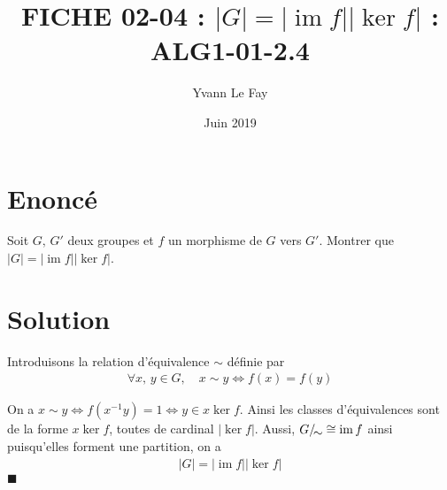 \documentclass{article}
\newcommand*{\QED}{\hfill\ensuremath{\blacksquare}}%
\DeclareMathOperator{\im}{im}
\begin{document}
\title{FICHE 02-04 : $|G|=|\im f||\ker f|$ : ALG1-01-2.4}
\author{Yvann Le Fay}
\date{Juin 2019}
\maketitle
\section*{Enoncé}
Soit $G,\, G'$ deux groupes et $f$ un morphisme de $G$ vers $G'$. Montrer que $|G|=|\im f||\ker f|$.
\section*{Solution}
Introduisons la relation d'équivalence $\sim$ définie par 
\begin{align*}
\forall x,\, y\in G,\quad x\sim y \Longleftrightarrow f(x) = f(y)
\end{align*}

On a $x\sim y \Longleftrightarrow f(x^{-1}y) = 1 \Longleftrightarrow y\in x\ker f$. Ainsi les classes d'équivalences sont de la forme $x\ker f$, toutes de cardinal $|\ker f|$. Aussi, $G/\!\raisebox{-.50ex}{\ensuremath{\sim}} \cong \im f$ ainsi puisqu'elles forment une partition, on a
\begin{align*}
|G|=|\im f||\ker f|
\end{align*}
\QED
\end{document}
